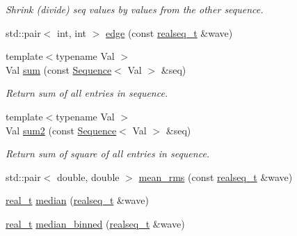 \begin{DoxyCompactItemize}
\begin{DoxyCompactList}\small\item\em Shrink (divide) seq values by values from the other sequence. \end{DoxyCompactList}\item 
std\+::pair$<$ int, int $>$ \hyperlink{namespace_wire_cell_1_1_waveform_ae368e58f014b0d634028afcbb05887cb}{edge} (const \hyperlink{namespace_wire_cell_1_1_waveform_a479175e541c8545e87cd8063b74b6956}{realseq\+\_\+t} \&wave)
\item 
{\footnotesize template$<$typename Val $>$ }\\Val \hyperlink{namespace_wire_cell_1_1_waveform_a4c7b82a4567d6c94227398f9511ffb92}{sum} (const \hyperlink{namespace_wire_cell_1_1_waveform_a1d2a1b672e3b220dcd64a994531de95d}{Sequence}$<$ Val $>$ \&seq)
\begin{DoxyCompactList}\small\item\em Return sum of all entries in sequence. \end{DoxyCompactList}\item 
{\footnotesize template$<$typename Val $>$ }\\Val \hyperlink{namespace_wire_cell_1_1_waveform_a6aa0cf31fb8548b1f74ffb3f77350668}{sum2} (const \hyperlink{namespace_wire_cell_1_1_waveform_a1d2a1b672e3b220dcd64a994531de95d}{Sequence}$<$ Val $>$ \&seq)
\begin{DoxyCompactList}\small\item\em Return sum of square of all entries in sequence. \end{DoxyCompactList}\item 
std\+::pair$<$ double, double $>$ \hyperlink{namespace_wire_cell_1_1_waveform_af0395e9b0e5e9e86a26579badb834092}{mean\+\_\+rms} (const \hyperlink{namespace_wire_cell_1_1_waveform_a479175e541c8545e87cd8063b74b6956}{realseq\+\_\+t} \&wave)
\item 
\hyperlink{namespace_wire_cell_1_1_waveform_a47570354e4599d8387803188186aba1f}{real\+\_\+t} \hyperlink{namespace_wire_cell_1_1_waveform_af5e9352cbf35ddaf2f95e924d241a2aa}{median} (\hyperlink{namespace_wire_cell_1_1_waveform_a479175e541c8545e87cd8063b74b6956}{realseq\+\_\+t} \&wave)
\item 
\hyperlink{namespace_wire_cell_1_1_waveform_a47570354e4599d8387803188186aba1f}{real\+\_\+t} \hyperlink{namespace_wire_cell_1_1_waveform_a9a72f0b40ec9e5b44713c59f338f6fd3}{median\+\_\+binned} (\hyperlink{namespace_wire_cell_1_1_waveform_a479175e541c8545e87cd8063b74b6956}{realseq\+\_\+t} \&wave)
\item 

\end{DoxyCompactItemize}
